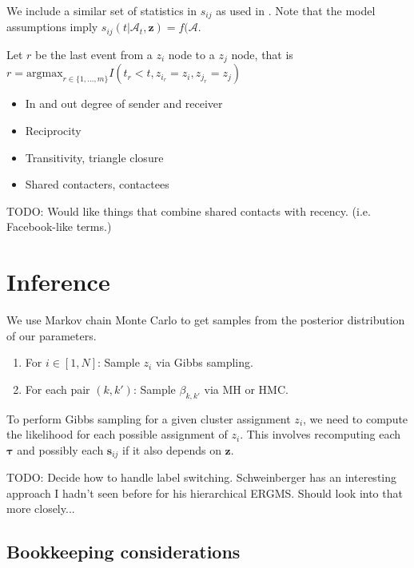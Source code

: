 \documentclass[11pt]{article}
\begin{document}
We include a similar set of statistics in $s_{ij}$ as used in \cite{Butts2008,Vuy2011}.
Note that the model assumptions imply $s_{ij}(t|\mathcal{A}_t,\mathbf{z}) = f(\mathcal{A}$.

Let $r$ be the last event from a $z_i$ node to a $z_j$ node, that is $r = \mbox{argmax}_{r \in \{1, \ldots, m\}}I(t_r < t, z_{i_r} = z_i, z_{j_r} = z_j)$

\begin{itemize}
\item In and out degree of sender and receiver
\item Reciprocity
\item Transitivity, triangle closure
\item Shared contacters, contactees
\end{itemize}

TODO: Would like things that combine shared contacts with recency. (i.e. Facebook-like terms.) 

\section{Inference}

We use Markov chain Monte Carlo to get samples from the posterior distribution of our parameters.  

\begin{enumerate}
\item For $i \in [1,N]$: Sample $z_i$ via Gibbs sampling.
\item For each pair $(k,k')$: Sample $\beta_{k,k'}$ via MH or HMC.
\end{enumerate}

To perform Gibbs sampling for a given cluster assignment $z_i$, we need to compute the likelihood for each possible assignment of $z_i$.  This involves recomputing each $\boldsymbol{\tau}$ and possibly each $\mathbf{s}_{ij}$ if it also depends on $\mathbf{z}$.

TODO: Decide how to handle label switching.  Schweinberger has an interesting approach I hadn't seen before for his hierarchical ERGMS.  Should look into that more closely...

\subsection*{Bookkeeping considerations}
\end{document}
